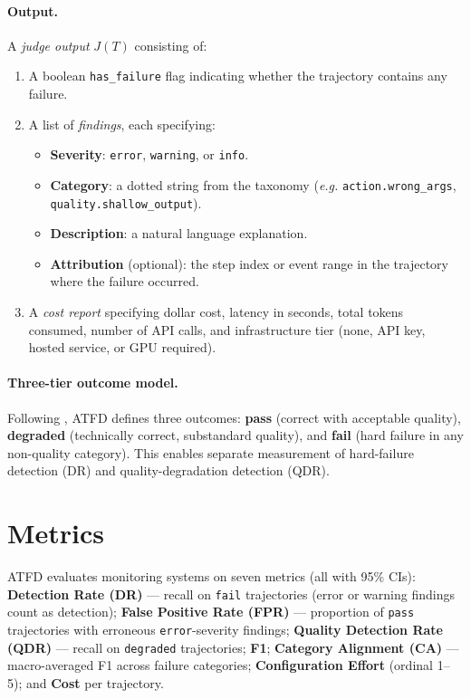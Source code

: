 \documentclass[11pt]{article}
\newcommand{\atfd}{\textsc{ATFD}\xspace}
\newcommand{\eg}{\emph{e.g.}\xspace}
\begin{document}
\paragraph{Output.} A \emph{judge output} $J(T)$ consisting of:
\begin{enumerate}[leftmargin=2em]
  \item A boolean \texttt{has\_failure} flag indicating whether the
    trajectory contains any failure.
  \item A list of \emph{findings}, each specifying:
    \begin{itemize}
      \item \textbf{Severity}: \texttt{error}, \texttt{warning}, or
        \texttt{info}.
      \item \textbf{Category}: a dotted string from the taxonomy (\eg
        \texttt{action.wrong\_args}, \texttt{quality.shallow\_output}).
      \item \textbf{Description}: a natural language explanation.
      \item \textbf{Attribution} (optional): the step index or event range
        in the trajectory where the failure occurred.
    \end{itemize}
  \item A \emph{cost report} specifying dollar cost, latency in seconds,
    total tokens consumed, number of API calls, and infrastructure tier
    (none, API key, hosted service, or GPU required).
\end{enumerate}

\paragraph{Three-tier outcome model.}
Following \citet{ma2024agentboard}, \atfd defines three outcomes:
\textbf{pass} (correct with acceptable quality),
\textbf{degraded} (technically correct, substandard quality), and
\textbf{fail} (hard failure in any non-quality category). This enables
separate measurement of hard-failure detection (DR) and
quality-degradation detection (QDR).

\section{Metrics}
\label{sec:metrics}

\atfd evaluates monitoring systems on seven metrics (all with
95\% CIs): \textbf{Detection Rate (DR)} --- recall on \texttt{fail}
trajectories (error or warning findings count as detection);
\textbf{False Positive Rate (FPR)} --- proportion of \texttt{pass}
trajectories with erroneous \texttt{error}-severity findings;
\textbf{Quality Detection Rate (QDR)} --- recall on \texttt{degraded}
trajectories; \textbf{F1}; \textbf{Category Alignment (CA)} ---
macro-averaged F1 across failure categories; \textbf{Configuration Effort}
(ordinal 1--5); and \textbf{Cost} per trajectory.
\end{document}
